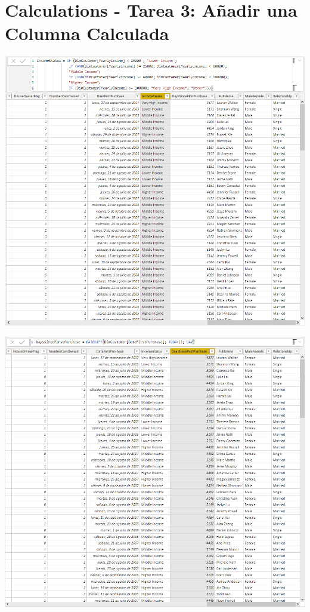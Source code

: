 \section{Calculations - Tarea 3: Añadir una Columna Calculada} 

\begin{center}
\includegraphics[width=20cm]{./Imagenes/CapturaNro03}
\end{center}

\begin{center}
\includegraphics[width=20cm]{./Imagenes/CapturaNro04}
\end{center}

